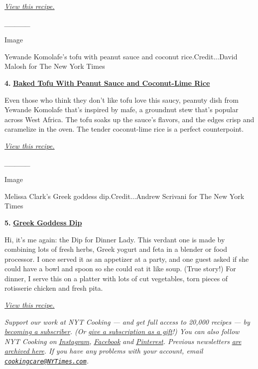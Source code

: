 \emph{\href{https://cooking.nytimes3xbfgragh.onion/recipes/1019504-korean-bulgogi-bolognese}{View
this recipe.}}

\emph{\_\_\_\_\_}

Image

Yewande Komolafe's tofu with peanut sauce and coconut
rice.Credit...David Malosh for The New York Times

\textbf{4.}
\href{https://cooking.nytimes3xbfgragh.onion/recipes/1020530-baked-tofu-with-peanut-sauce-and-coconut-lime-rice}{\textbf{Baked
Tofu With Peanut Sauce and Coconut-Lime Rice}}

Even those who think they don't like tofu love this saucy, peanuty dish
from Yewande Komolafe that's inspired by mafe, a groundnut stew that's
popular across West Africa. The tofu soaks up the sauce's flavors, and
the edges crisp and caramelize in the oven. The tender coconut-lime rice
is a perfect counterpoint.

\emph{\href{https://cooking.nytimes3xbfgragh.onion/recipes/1020530-baked-tofu-with-peanut-sauce-and-coconut-lime-rice}{View
this recipe.}}

\emph{\_\_\_\_\_}

Image

Melissa Clark's Greek goddess dip.Credit...Andrew Scrivani for The New
York Times

\textbf{5.}
\href{https://cooking.nytimes3xbfgragh.onion/recipes/1013024-greek-goddess-dip}{\textbf{Greek
Goddess Dip}}

Hi, it's me again: the Dip for Dinner Lady. This verdant one is made by
combining lots of fresh herbs, Greek yogurt and feta in a blender or
food processor. I once served it as an appetizer at a party, and one
guest asked if she could have a bowl and spoon so she could eat it like
soup. (True story!) For dinner, I serve this on a platter with lots of
cut vegetables, torn pieces of rotisserie chicken and fresh pita.

\emph{\href{https://cooking.nytimes3xbfgragh.onion/recipes/1013024-greek-goddess-dip}{View
this recipe.}}

\emph{Support our work at NYT Cooking --- and get full access to 20,000
recipes --- by}
\emph{\href{https://www.nytimes3xbfgragh.onion/subscription/cooking.html?campaignId=788FJ}{becoming
a subscriber}. (Or}
\emph{\href{https://www.nytimes3xbfgragh.onion/subscriptions/Multiproduct/cooking_gift.html?campaignId=78X7R}{give
a subscription as a gift}!) You can also follow NYT Cooking on}
\emph{\href{https://www.instagram.com/nytcooking}{Instagram},}
\emph{\href{https://www.facebookcorewwwi.onion/nytcooking/}{Facebook}}
\emph{and}
\emph{\href{https://www.pinterest.com/nytcooking/}{Pinterest}. Previous
newsletters}
\emph{\href{https://www.nytimes3xbfgragh.onion/column/five-weeknight-dishes}{are
archived here}. If you have any problems with your account, email}
\emph{\href{mailto:cookingcare@NYTimes.com}{\nolinkurl{cookingcare@NYTimes.com}}.}

